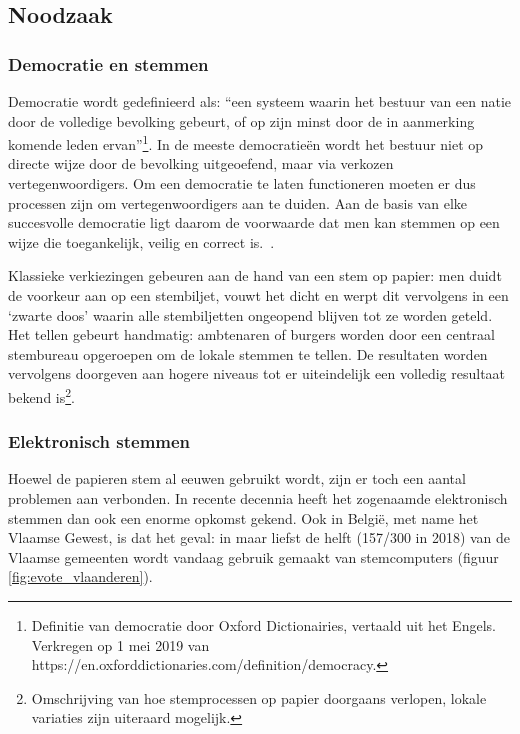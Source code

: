 	\subsection{Noodzaak}
			\subsubsection{Democratie en stemmen}
			Democratie wordt gedefinieerd als: ``een systeem waarin het bestuur van een natie door de volledige bevolking gebeurt, of op zijn minst door de in aanmerking komende leden ervan''\footnote{ Definitie van democratie door Oxford Dictionairies, vertaald uit het Engels. Verkregen op 1 mei 2019 van https://en.oxforddictionaries.com/definition/democracy.}. In de meeste democratieën wordt het bestuur niet op directe wijze door de bevolking uitgeoefend, maar via verkozen vertegenwoordigers. Om een democratie te laten functioneren moeten er dus processen zijn om vertegenwoordigers aan te duiden.  Aan de basis van elke succesvolle democratie ligt daarom de voorwaarde dat men kan stemmen op een wijze die toegankelijk, veilig en correct is.~\autocite{Osgood2016}. 
			
			Klassieke verkiezingen gebeuren aan de hand van een stem op papier: men duidt de voorkeur aan op een stembiljet, vouwt het dicht en werpt dit vervolgens in een `zwarte doos' waarin alle stembiljetten ongeopend blijven tot ze worden geteld. Het tellen gebeurt handmatig: ambtenaren of burgers worden door een centraal stembureau opgeroepen om de lokale stemmen te tellen. De resultaten worden vervolgens doorgeven aan hogere niveaus tot er uiteindelijk een volledig resultaat bekend is\footnote{Omschrijving van hoe stemprocessen op papier doorgaans verlopen, lokale variaties zijn uiteraard mogelijk.}.
			
			\subsubsection{Elektronisch stemmen}
			Hoewel de papieren stem al eeuwen gebruikt wordt, zijn er toch een aantal problemen aan verbonden. In recente decennia heeft het zogenaamde elektronisch stemmen dan ook een enorme opkomst gekend. Ook in België, met name het Vlaamse Gewest, is dat het geval: in maar liefst de helft (157/300 in 2018) van de Vlaamse gemeenten wordt vandaag gebruik gemaakt van stemcomputers (figuur \ref{fig:evote_vlaanderen}).
			
